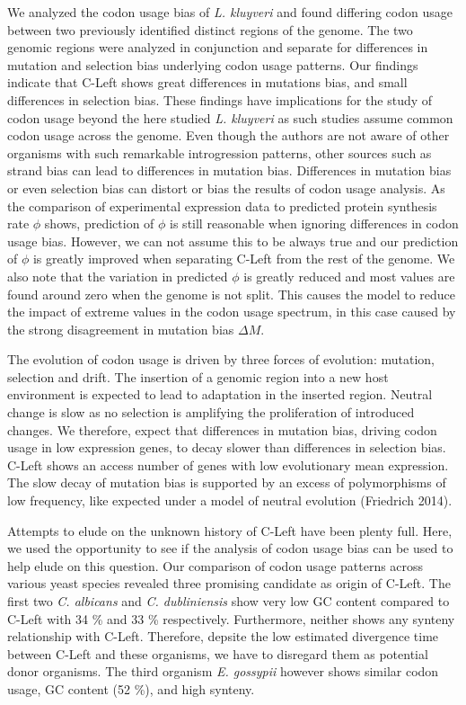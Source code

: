 \documentclass[12pt]{article}
\begin{document}
We analyzed the codon usage bias of \textit{L. kluyveri} and found differing codon usage between two previously identified distinct regions of the genome. 
The two genomic regions were analyzed in conjunction and separate for differences in mutation and selection bias underlying codon usage patterns.
Our findings indicate that C-Left shows great differences in mutations bias, and small differences in selection bias.
These findings have implications for the study of codon usage beyond the here studied \textit{L. kluyveri} as such studies assume common codon usage across the genome.
Even though the authors are not aware of other organisms with such remarkable introgression patterns, other sources such as strand bias can lead to differences in mutation bias.
Differences in mutation bias or even selection bias can distort or bias the results of codon usage analysis. 
As the comparison of experimental expression data to predicted protein synthesis rate $\phi$ shows, prediction of $\phi$ is still reasonable when ignoring differences in codon usage bias. 
However, we can not assume this to be always true and our prediction of $\phi$ is greatly improved when separating C-Left from the rest of the genome.
We also note that the variation in predicted $\phi$ is greatly reduced and most values are found around zero when the genome is not split.
This causes the model to reduce the impact of extreme values in the codon usage spectrum, in this case caused by the strong disagreement in mutation bias $\Delta M$.

The evolution of codon usage is driven by three forces of evolution: mutation, selection and drift.
The insertion of a genomic region into a new host environment is expected to lead to adaptation in the inserted region.
Neutral change is slow as no selection is amplifying the proliferation of introduced changes.
We therefore, expect that differences in mutation bias, driving codon usage in low expression genes, to decay slower than differences in selection bias.
C-Left shows an access number of genes with low evolutionary mean expression.
The slow decay of mutation bias is supported by an excess of polymorphisms of low frequency, like expected under a model of neutral evolution (Friedrich 2014).

Attempts to elude on the unknown history of C-Left have been plenty full.
Here, we used the opportunity to see if the analysis of codon usage bias can be used to help elude on this question.
Our comparison of codon usage patterns across various yeast species revealed three promising candidate as origin of C-Left.
The first two \textit{C. albicans} and \textit{C. dubliniensis} show very low GC content compared to C-Left with 34 \% and 33 \% respectively. 
Furthermore, neither shows any synteny relationship with C-Left.
Therefore, depsite the low estimated divergence time between C-Left and these organisms, we have to disregard them as potential donor organisms. 
The third organism \textit{E. gossypii} however shows similar codon usage, GC content (52 \%), and high synteny.  
\end{document}
